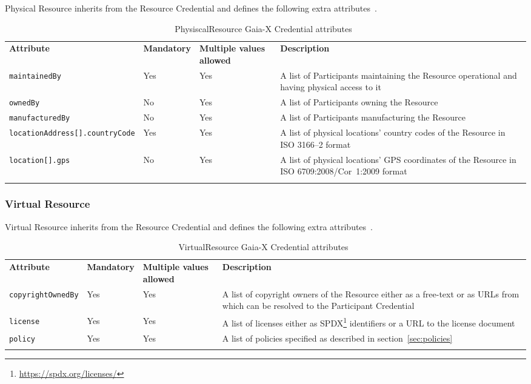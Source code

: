 Physical Resource inherits from the Resource Credential and defines the following extra attributes~\cite{gaiax_trust_framework}.

\begin{longtable}{ |p{4cm}|p{2cm}|p{2cm}|p{7cm}| }
    \hhline{----}
    \textbf{Attribute} & \textbf{Mandatory} & \textbf{Multiple values allowed} & \textbf{Description}\\
    \hhline{----}
    \texttt{maintainedBy} & Yes & Yes & A list of Participants maintaining the Resource operational and having physical access to it\\
    \hhline{----}
    \texttt{ownedBy} & No & Yes & A list of Participants owning the Resource\\
    \hhline{----}
    \texttt{manufacturedBy} & No & Yes & A list of Participants manufacturing the Resource\\
    \hhline{----}
    \texttt{locationAddress[].countryCode} & Yes & Yes & A list of physical locations' country codes of the Resource in ISO 3166--2 format\\
    \hhline{----}
    \texttt{location[].gps} & No & Yes & A list of physical locations' GPS coordinates of the Resource in ISO 6709:2008/Cor~1:2009 format\\
    \hhline{----}
    \caption{PhysiscalResource Gaia-X Credential attributes~\cite{gaiax_trust_framework}}
    \label{tab:physical_resource}
\end{longtable}

\subsubsection{Virtual Resource}

Virtual Resource inherits from the Resource Credential and defines the following extra attributes~\cite{gaiax_trust_framework}.

\begin{longtable}{ |p{4cm}|p{2cm}|p{2cm}|p{7cm}| }
    \hhline{----}
    \textbf{Attribute} & \textbf{Mandatory} & \textbf{Multiple values allowed} & \textbf{Description}\\
    \hhline{----}
    \texttt{copyrightOwnedBy} & Yes & Yes & A list of copyright owners of the Resource either as a free-text or as URLs from which can be resolved to the Participant Credential\\
    \hhline{----}
    \texttt{license} & Yes & Yes & A list of licenses either as SPDX\footnote{\url{https://spdx.org/licenses/}} identifiers or a URL to the license document\\
    \hhline{----}
    \texttt{policy} & Yes & Yes & A list of policies specified as described in section~\ref{sec:policies}\\
    \hhline{----}
    \caption{VirtualResource Gaia-X Credential attributes~\cite{gaiax_trust_framework}}
    \label{tab:virtual_resource}
\end{longtable}

